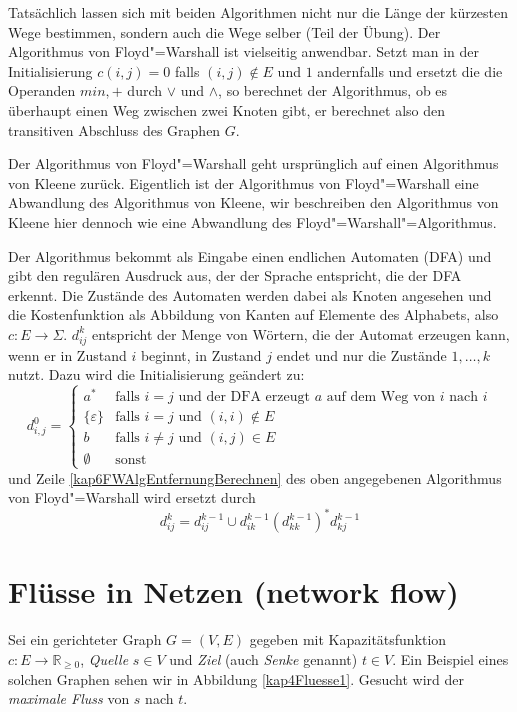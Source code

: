 Tatsächlich lassen sich mit beiden Algorithmen nicht nur die Länge der kürzesten Wege bestimmen, sondern auch die Wege selber (Teil der Übung). Der Algorithmus von Floyd"=Warshall ist vielseitig anwendbar. Setzt man in der Initialisierung $c(i,j) = 0$ falls $(i,j) \notin E$ und $1$ andernfalls und ersetzt die die Operanden $min, +$ durch $\vee$ und $\wedge$, so berechnet der Algorithmus, ob es überhaupt einen Weg zwischen zwei Knoten gibt, er berechnet also den transitiven Abschluss des Graphen $G$.

Der Algorithmus von Floyd"=Warshall geht ursprünglich auf einen Algorithmus von Kleene zurück. Eigentlich ist der Algorithmus von Floyd"=Warshall eine Abwandlung des Algorithmus von Kleene, wir beschreiben den Algorithmus von Kleene hier dennoch wie eine Abwandlung des Floyd"=Warshall"=Algorithmus.

Der Algorithmus bekommt als Eingabe einen endlichen Automaten (DFA) und gibt den regulären Ausdruck aus, der der Sprache entspricht, die der DFA erkennt. Die Zustände des Automaten werden dabei als Knoten angesehen und die Kostenfunktion als Abbildung von Kanten auf Elemente des Alphabets, also $c: E \to \Sigma$. $d_{ij}^k$ entspricht der Menge von Wörtern, die der Automat erzeugen kann, wenn er in Zustand $i$ beginnt, in Zustand $j$ endet und nur die Zustände $1, \ldots, k$ nutzt. Dazu wird die Initialisierung geändert zu:
\[ d_{i,j}^0 = \begin{cases}
                 a^* & \text{falls $i=j$ und der DFA erzeugt $a$ auf dem Weg von $i$ nach $i$}\\
                 \{ \varepsilon \} & \text{falls $i=j$ und } (i,i) \notin E\\
                 b & \text{falls $i \neq j$ und } (i,j) \in E \\
                 \emptyset & \text{sonst}
\end{cases} \]
und Zeile \ref{kap6FWAlgEntfernungBerechnen} des oben angegebenen Algorithmus von Floyd"=Warshall wird ersetzt durch
\[ d_{ij}^k = d_{ij}^{k-1} \cup d_{ik}^{k-1} (d_{kk}^{k-1})^* d_{kj}^{k-1} \]

\section{Flüsse in Netzen (network flow)}
Sei ein gerichteter Graph $G=(V,E)$ gegeben mit Kapazitätsfunktion $c: E \to \mathbb{R}_{\ge 0}$, \textit{Quelle} $s \in V$ und \textit{Ziel} (auch \textit{Senke} genannt) $t \in V$. Ein Beispiel eines solchen Graphen sehen wir in Abbildung \vref{kap4Fluesse1}. Gesucht wird der \textit{maximale Fluss} von $s$ nach $t$.

